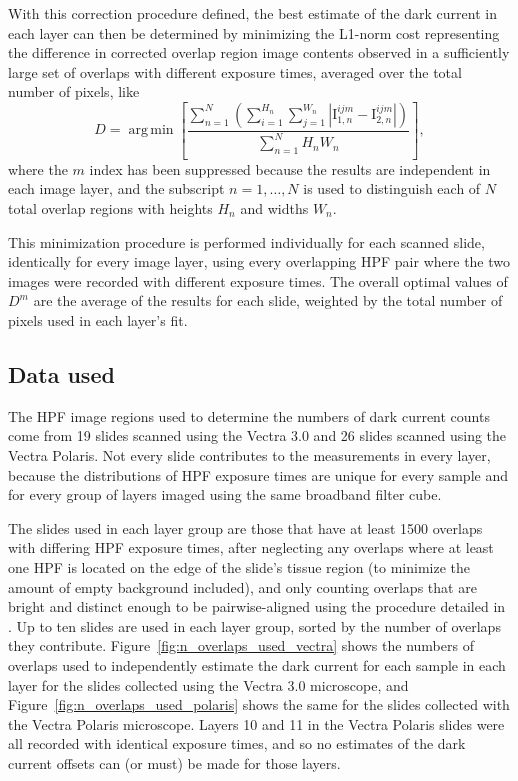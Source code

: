 \documentclass[letterpaper,11pt]{article}
\newcommand{\reffig}[1]{Figure~\ref{#1}}
\DeclareMathOperator*{\argmin}{arg\,min}
\newcommand{\Iota}{\mathrm{I}}
\begin{document}
With this correction procedure defined, the best estimate of the dark current in each layer can then be determined by minimizing the L1-norm cost representing the difference in corrected overlap region image contents observed in a sufficiently large set of overlaps with different exposure times, averaged over the total number of pixels, like
\begin{equation}
D = \argmin{ \left[ \frac{ \sum_{n=1}^{N} \left( \sum_{i=1}^{H_{n}} \sum_{j=1}^{W_{n}} \left| \Iota^{ijm}_{1,n} - \Iota^{ijm}_{2,n} \right| \right) }{ \sum_{n=1}^{N} H_{n}W_{n}} \right] },
\label{eq:minimization_def}
\end{equation} 
where the $m$ index has been suppressed because the results are independent in each image layer, and the subscript $n=1,\ldots,N$ is used to distinguish each of $N$ total overlap regions with heights $H_{n}$ and widths $W_{n}$. 

This minimization procedure is performed individually for each scanned slide, identically for every image layer, using every overlapping HPF pair where the two images were recorded with different exposure times. The overall optimal values of $D^{m}$ are the average of the results for each slide, weighted by the total number of pixels used in each layer's fit.  

\subsection{Data used}
\label{ssec:data_used}

The HPF image regions used to determine the numbers of dark current counts come from 19 slides scanned using the Vectra 3.0 and 26 slides scanned using the Vectra Polaris. Not every slide contributes to the measurements in every layer, because the distributions of HPF exposure times are unique for every sample and for every group of layers imaged using the same broadband filter cube. 

The slides used in each layer group are those that have at least 1500 overlaps with differing HPF exposure times, after neglecting any overlaps where at least one HPF is located on the edge of the slide's tissue region (to minimize the amount of empty background included), and only counting overlaps that are bright and distinct enough to be pairwise-aligned using the procedure detailed in \cite{Heshy}. Up to ten slides are used in each layer group, sorted by the number of overlaps they contribute. \reffig{fig:n_overlaps_used_vectra} shows the numbers of overlaps used to independently estimate the dark current for each sample in each layer for the slides collected using the Vectra 3.0 microscope, and \reffig{fig:n_overlaps_used_polaris} shows the same for the slides collected with the Vectra Polaris microscope. Layers 10 and 11 in the Vectra Polaris slides were all recorded with identical exposure times, and so no estimates of the dark current offsets can (or must) be made for those layers. 
\end{document}
